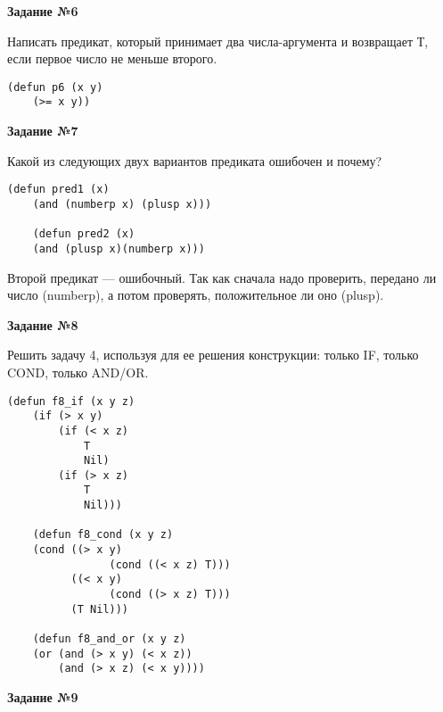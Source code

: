 \textbf{Задание №6}

Написать предикат, который принимает два числа-аргумента и возвращает
Т, если первое число не меньше второго.
\begin{center}
    \captionsetup{justification=raggedright,singlelinecheck=off}
    \begin{lstlisting}[label=lst:task_6,caption=Код функции]
    (defun p6 (x y)
    (>= x y))
\end{lstlisting}
\end{center}

\textbf{Задание №7}

Какой из следующих двух вариантов предиката ошибочен и почему?
\begin{center}
    \captionsetup{justification=raggedright,singlelinecheck=off}
    \begin{lstlisting}[label=lst:task_7,caption=Код функции]
    (defun pred1 (x) 
    (and (numberp x) (plusp x))) 
    
    (defun pred2 (x)
    (and (plusp x)(numberp x)))
\end{lstlisting}
\end{center}

Второй предикат --- ошибочный. Так как сначала надо проверить, передано ли число (numberp), а потом проверять, положительное ли оно (plusp).

\clearpage
\textbf{Задание №8}

Решить задачу 4, используя для ее решения конструкции: только IF, только COND, только AND/OR.
\begin{center}
    \captionsetup{justification=raggedright,singlelinecheck=off}
    \begin{lstlisting}[label=lst:task_8,caption=Код функций]
    (defun f8_if (x y z)
    (if (> x y)
        (if (< x z)
            T
            Nil)
        (if (> x z)
            T
            Nil)))
    
    (defun f8_cond (x y z)
    (cond ((> x y)
                (cond ((< x z) T)))
          ((< x y)
                (cond ((> x z) T)))
          (T Nil)))
    
    (defun f8_and_or (x y z)
    (or (and (> x y) (< x z))
        (and (> x z) (< x y))))
\end{lstlisting}
\end{center}

\textbf{Задание №9}

